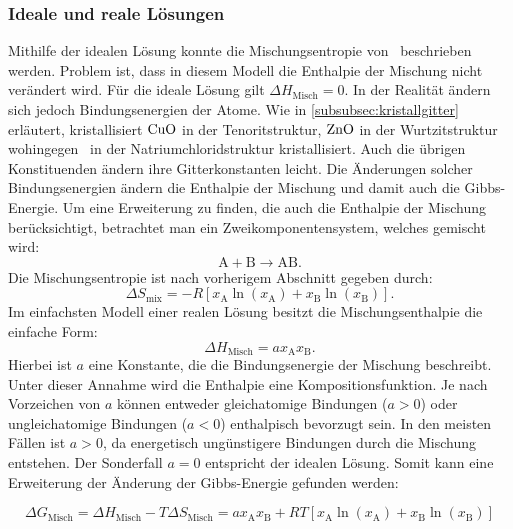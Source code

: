 \subsubsection{Ideale und reale Lösungen}
Mithilfe der idealen Lösung konnte die Mischungsentropie von \heo\ beschrieben werden.
Problem ist, dass in diesem Modell die Enthalpie der Mischung nicht verändert wird.
Für die ideale Lösung gilt $\Delta H_\mathrm{Misch} = 0$.
In der Realität ändern sich jedoch Bindungsenergien der Atome.
Wie in \cref{subsubsec:kristallgitter} erläutert, kristallisiert $\ce{CuO}$ in der Tenoritstruktur, $\ce{ZnO}$ in der
Wurtzitstruktur wohingegen \heo\ in der Natriumchloridstruktur kristallisiert.
Auch die übrigen Konstituenden ändern ihre Gitterkonstanten leicht.
Die Änderungen solcher Bindungsenergien ändern die Enthalpie der Mischung und damit auch die Gibbs-Energie.
Um eine Erweiterung zu finden, die auch die Enthalpie der Mischung berücksichtigt, betrachtet man ein
Zweikomponentensystem, welches gemischt wird:
\begin{equation}
    \mathrm{A} + \mathrm{B} \longrightarrow \mathrm{AB}.
    \label{eq:reaktion}
\end{equation}
Die Mischungsentropie ist nach vorherigem Abschnitt gegeben durch:
\begin{equation}
    \Delta S_{\mathrm{mix}}=-R[x_{\mathrm{A}}\ln(x_{\mathrm{A}})+x_{\mathrm{B}}\ln(x_{\mathrm{B}})].
    \label{eq:Mischungsentropie3}
\end{equation}
Im einfachsten Modell einer realen Lösung besitzt die Mischungsenthalpie die einfache Form:
\begin{equation}
    \Delta H_{\mathrm{Misch}}= a x_{\mathrm{A}} x_{\mathrm{B}}.
    \label{eq:Mischungsenthalpie}
\end{equation}
Hierbei ist $a$ eine Konstante, die die Bindungsenergie der Mischung beschreibt.
Unter dieser Annahme wird die Enthalpie eine Kompositionsfunktion.
Je nach Vorzeichen von $a$ können entweder gleichatomige Bindungen ($a > 0$) oder ungleichatomige Bindungen
($a < 0$) enthalpisch bevorzugt sein.
In den meisten Fällen ist $a > 0$, da energetisch ungünstigere Bindungen durch die Mischung entstehen.
Der Sonderfall $a=0$ entspricht der idealen Lösung.
Somit kann eine Erweiterung der Änderung der Gibbs-Energie gefunden werden:

\begin{equation}
    \Delta G_{\mathrm{Misch}}=\Delta H_{\mathrm{Misch}}-T\Delta S_{\mathrm{Misch}}=a x_{\mathrm{A}} x_{\mathrm{B}}
    +RT[x_{\mathrm{A}}\ln(x_{\mathrm{A}})+x_{\mathrm{B}}\ln(x_{\mathrm{B}})]
    \label{eq:mischgibbs}
\end{equation}

